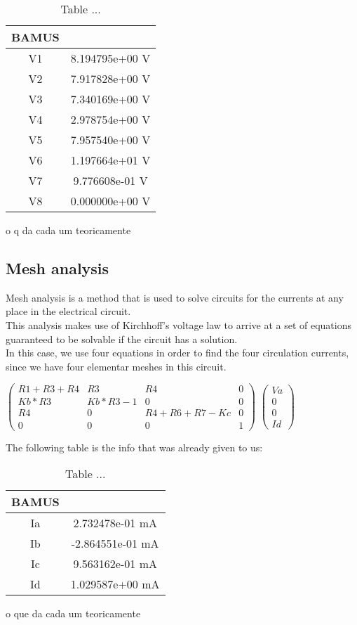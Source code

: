 \begin{table}
\centering
\begin{tabular}{c|c} 
 \hline
 BAMUS\\ [0.5ex] 
 \hline\hline
V1 & 8.194795e+00 V\\ \hline
V2 & 7.917828e+00 V\\ \hline
V3 & 7.340169e+00 V\\ \hline
V4 & 2.978754e+00 V\\ \hline
V5 & 7.957540e+00 V\\ \hline
V6 & 1.197664e+01 V\\ \hline
V7 & 9.776608e-01 V\\ \hline
V8 & 0.000000e+00 V\\ \hline [1ex] 
\end{tabular}
\caption{Table ...}
\label{table:2}
\end{table}

o q da cada um teoricamente

\subsection{Mesh analysis}

Mesh analysis is a method that is used to solve circuits for the currents at any place in the electrical circuit.\\
This analysis makes use of Kirchhoff’s voltage law to arrive at a set of equations guaranteed to be solvable if the circuit has a solution.\\In this case, we use four equations in order to find the four circulation currents, since we have four elementar meshes in this circuit.

$\begin{pmatrix}
R1+R3+R4 & R3 & R4 & 0 \\
Kb*R3 & Kb*R3 - 1 & 0 & 0 \\
R4 & 0 & R4+R6+R7-Kc & 0 \\
0 & 0 & 0 & 1 
\end{pmatrix}$
$\begin{pmatrix}
Va\\
0\\
0\\
Id
\end{pmatrix}$


The following table is the info that was already given to us:

\begin{table}
\centering
\begin{tabular}{c|c} 
 \hline
 BAMUS\\ [0.5ex] 
 \hline\hline
Ia & 2.732478e-01 mA\\ \hline
Ib & -2.864551e-01 mA\\ \hline
Ic & 9.563162e-01 mA\\ \hline
Id & 1.029587e+00 mA\\ \hline [1ex] 
\end{tabular}
\caption{Table ...}
\label{table:3}
\end{table}


o que da cada um teoricamente
















